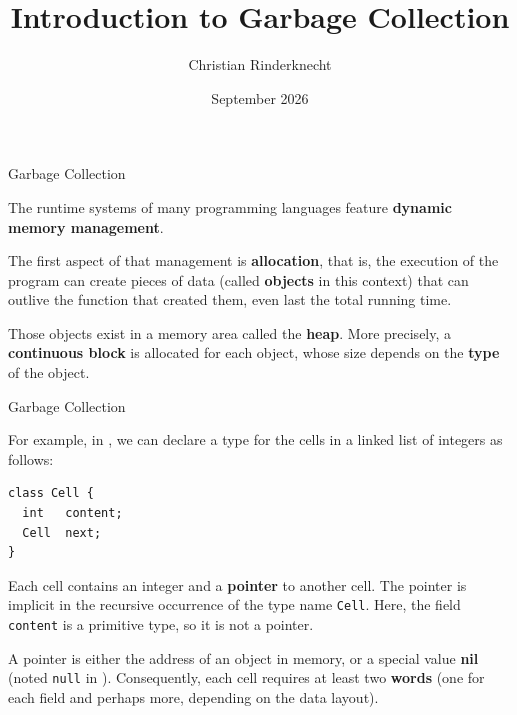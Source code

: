 \documentclass[compress,dvipdfmx]{beamer}
\title{\LARGE Introduction to Garbage Collection}
\author{\Large Christian Rinderknecht}
\institute{\normalsize Eszterházy Károly Katolikus Egyetem}
\date{September 2026}
\begin{document}
\frame{\maketitle}

%
\begin{frame}{Garbage Collection}

  The runtime systems of many programming languages feature
  \textbf{dynamic memory management}.

  \bigskip

  The first aspect of that management is \textbf{allocation}, that is,
  the execution of the program can create pieces of data (called
  \textbf{objects} in this context) that can outlive the function that
  created them, even last the total running time.

  \bigskip

  Those objects exist in a memory area called the \textbf{heap}. More
  precisely, a \textbf{continuous block} is allocated for each object,
  whose size depends on the \textbf{type} of the object.

\end{frame}

%
\begin{frame}[fragile]{Garbage Collection}

  For example, in \Java, we can declare a type for the cells
  in a linked list of integers as follows:
\begin{verbatim}
class Cell {
  int   content;
  Cell  next;
}
\end{verbatim}
Each cell contains an integer and a \textbf{pointer} to another
cell. The pointer is implicit in the recursive occurrence of the type
name \texttt{Cell}. Here, the field \texttt{content} is a primitive
type, so it is not a pointer.

\bigskip

A pointer is either the address of an object in memory, or a special
value \textbf{nil} (noted \texttt{null} in \Java). Consequently, each
cell requires at least two \textbf{words} (one for each field and
perhaps more, depending on the data layout).

\end{frame}
\end{document}

